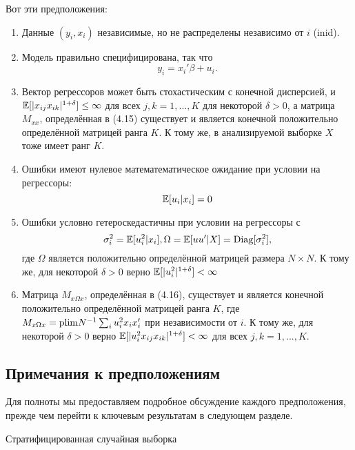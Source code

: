 Вот эти предположения:
\begin{small}
\begin{enumerate}
\item Данные $(y_i, x_i)$ независимые, но не распределены независимо от $i$ (inid).
\item Модель правильно специфицирована, так что
$$y_i = x_i' \beta + u_i .$$
\item Вектор регрессоров может быть стохастическим с конечной дисперсией, и $\mathbb{E}[|x_{ij}x_{ik}|^{1+\delta}]\leq \infty$ для всех $j, k = 1, ..., K$ для некоторой $\delta >0$, а матрица $M_{xx}$, определённая в (4.15) существует и является конечной положительно определённой матрицей ранга $K$. К тому же, в анализируемой выборке $X$ тоже имеет ранг $K$. 
\item Ошибки имеют нулевое математематическое ожидание при условии на регрессоры:
$$\mathbb{E} [u_i | x_i] = 0$$
\item Ошибки условно гетероскедастичны при условии на регрессоры с
\begin{equation}
\sigma_i^2 = \mathbb{E}[u_i^2 | x_i], \\
\Omega = \mathbb{E} [uu'|X] = \mathrm{Diag} [\sigma_i^2],
\end{equation}
где $\Omega$ является положительно определённой матрицей размера $N \times N$. К тому же, для некоторой $\delta>0$ верно $\mathbb{E} [|u_i^2|^{1+\delta}]< \infty$
\item Матрица $M_{x \Omega x}$, определённая в (4.16), существует и является конечной положительно определённой матрицей ранга $K$, где $M_{x \Omega x} = \mathrm{plim } N^{-1} \sum_{i} u_i^2 x_i x_i'$ при независимости от $i$. К тому же, для некоторой $\delta>0$ верно $\mathbb{E} [|u_i^2 x_{ij} x_{ik}|^{1+\delta}]< \infty$ для всех $j, k = 1, ..., K$. 
\end{enumerate}
\end{small}

\subsection{Примечания к предположениям}
Для полноты мы предоставляем подробное обсуждение каждого предположения, прежде чем перейти к ключевым результатам в следующем разделе.

\begin{center}
Стратифицированная случайная выборка
\end{center}

